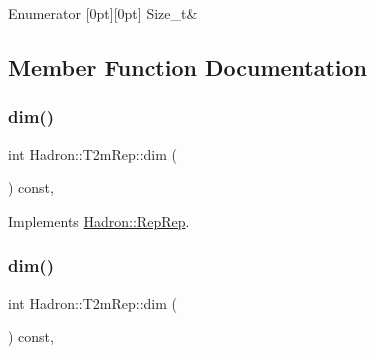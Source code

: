 \begin{DoxyEnumFields}{Enumerator}
[0pt][0pt]{}\mbox{\label{structHadron_1_1T2mRep_a97ceb174b3c180cabd0702063e112862aa4b0f5962e540dfe4d59e9ece3dfdada}} 
Size\+\_\+t&\\
\hline

\end{DoxyEnumFields}


\subsection{Member Function Documentation}
\mbox{\label{structHadron_1_1T2mRep_abd34f4a53af78200eaf2e03661f8af73}} 
\subsubsection{\texorpdfstring{dim()}{dim()}\hspace{0.1cm}{\footnotesize\ttfamily [1/3]}}
{\footnotesize\ttfamily int Hadron\+::\+T2m\+Rep\+::dim (\begin{DoxyParamCaption}{ }\end{DoxyParamCaption}) const\hspace{0.3cm}{\ttfamily [inline]}, {\ttfamily [virtual]}}



Implements \mbox{\hyperlink{structHadron_1_1RepRep_a92c8802e5ed7afd7da43ccfd5b7cd92b}{Hadron\+::\+Rep\+Rep}}.

\mbox{\label{structHadron_1_1T2mRep_abd34f4a53af78200eaf2e03661f8af73}} 
\subsubsection{\texorpdfstring{dim()}{dim()}\hspace{0.1cm}{\footnotesize\ttfamily [2/3]}}
{\footnotesize\ttfamily int Hadron\+::\+T2m\+Rep\+::dim (\begin{DoxyParamCaption}{ }\end{DoxyParamCaption}) const\hspace{0.3cm}{\ttfamily [inline]}, {\ttfamily [virtual]}}



